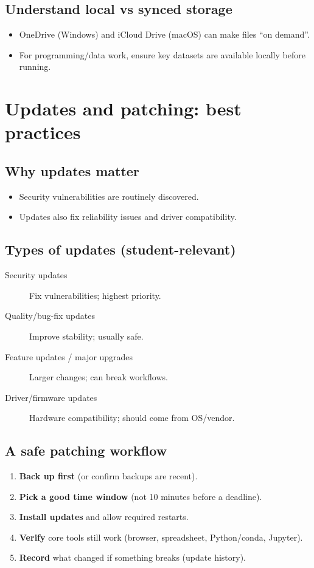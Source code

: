 \subsection{Understand local vs synced storage}
\begin{itemize}
\item OneDrive (Windows) and iCloud Drive (macOS) can make files “on demand”.
\item For programming/data work, ensure key datasets are available locally before running.
\end{itemize}

\section{Updates and patching: best practices}
\subsection{Why updates matter}
\begin{itemize}
\item Security vulnerabilities are routinely discovered.
\item Updates also fix reliability issues and driver compatibility.
\end{itemize}

\subsection{Types of updates (student-relevant)}
\begin{description}
\item[Security updates] Fix vulnerabilities; highest priority.
\item[Quality/bug-fix updates] Improve stability; usually safe.
\item[Feature updates / major upgrades] Larger changes; can break workflows.
\item[Driver/firmware updates] Hardware compatibility; should come from OS/vendor.
\end{description}

\subsection{A safe patching workflow}
\begin{enumerate}
\item \textbf{Back up first} (or confirm backups are recent).
\item \textbf{Pick a good time window} (not 10 minutes before a deadline).
\item \textbf{Install updates} and allow required restarts.
\item \textbf{Verify} core tools still work (browser, spreadsheet, Python/conda, Jupyter).
\item \textbf{Record} what changed if something breaks (update history).
\end{enumerate}

